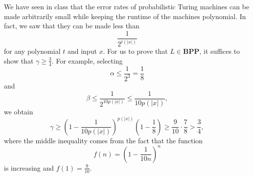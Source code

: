 \documentclass{amsart}
\theoremstyle{plain}
\theoremstyle{definition}
\newcommand{\bpp}{\textbf{BPP}}
\begin{document}
\begin{enumerate}[label=\textbf{Exercise \arabic*:}, leftmargin=0cm, labelwidth=-0.2cm, align=left]
            We have seen in class that the error rates of probabilistic Turing machines
            can be made arbitrarily small
            while keeping the runtime of the machines polynomial.
            In fact, we saw that they can be made less than
            \[
                \frac{1}{2^{t(|x|)}}
            \]
            for any polynomial $t$ and input $x$.
            For us to prove that $L \in \bpp$, it suffices to show that $\gamma \geq \frac{3}{4}$.
            For example, selecting
            \[
                \alpha \leq \frac{1}{2^3} = \frac{1}{8}
            \]
            and 
            \[
                \beta \leq \frac{1}{2^{10 p(|x|)}} \leq \frac{1}{10 p(|x|)},
            \]
            we obtain
            \[
                \gamma
                \geq \left(1 - \frac{1}{10 p(|x|)}\right)^{p(|x|)} \left( 1 - \frac{1}{8} \right)
                \geq \frac{9}{10} \cdot \frac{7}{8}
                > \frac{3}{4},
            \]
            where the middle inequality comes from the fact that the function
            \[
                f(n) = \left(1 - \frac{1}{10 n}\right)^{n}
            \]
            is increasing and $f(1) = \frac{9}{10}$.
        


    \end{enumerate}
\end{document}
